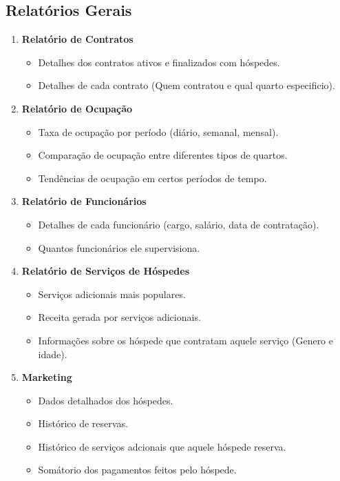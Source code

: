 \subsection{Relatórios Gerais} 
\begin{enumerate}
    \item \textbf{Relatório de Contratos}
    \begin{itemize}
        \item Detalhes dos contratos ativos e finalizados com hóspedes.
        \item Detalhes de cada contrato (Quem contratou e qual quarto especificio).
    \end{itemize}
    \item \textbf{Relatório de Ocupação}
    \begin{itemize}
        \item Taxa de ocupação por período (diário, semanal, mensal).
        \item Comparação de ocupação entre diferentes tipos de quartos.
        \item Tendências de ocupação em certos períodos de tempo.
    \end{itemize}
    \item \textbf{Relatório de Funcionários}
    \begin{itemize}
        \item Detalhes de cada funcionário (cargo, salário, data de contratação).
        \item Quantos funcionários ele supervisiona.
    \end{itemize}
    \item \textbf{Relatório de Serviços de Hóspedes}
    \begin{itemize}
        \item Serviços adicionais mais populares.
        \item Receita gerada por serviços adicionais.
        \item Informações sobre os hóspede que contratam aquele serviço (Genero e idade).
    \end{itemize}
    \item \textbf{Marketing}
    \begin{itemize}
        \item Dados detalhados dos hóspedes.
        \item Histórico de reservas.
        \item Histórico de serviços adcionais que aquele hóspede reserva.
        \item Somátorio dos pagamentos feitos pelo hóspede.
    \end{itemize}
\end{enumerate}

